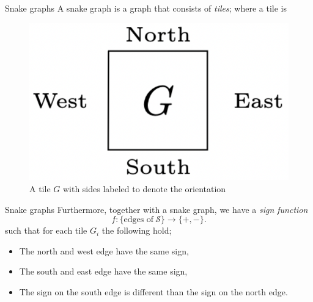 \documentclass{beamer}
\begin{document}
\begin{frame}{Snake graphs}
    A snake graph is a graph that consists of \emph{tiles}; where a tile is
\begin{figure}[H]
    \centering
    \includegraphics[width = 2.5 cm]{Images/prestile.png}   
\caption{A tile $G$ with sides labeled to denote the orientation}
\end{figure}
\end{frame}
\begin{frame}{Snake graphs}
    Furthermore, together with a snake graph, we have a \emph{sign function}
    \begin{equation*}
    f: \{\text{edges of} \  \mathcal{S}\} \to \{+,-\}.
\end{equation*}
such that for each tile $G_i$ the following hold;
\begin{itemize}
    \item The north and west edge have the same sign, \pause
    \item The south and east edge have the same sign, \pause
    \item The sign on the south edge is different than the sign on the north edge.
\end{itemize}
\end{frame}
\end{document}
